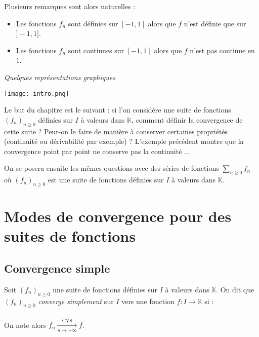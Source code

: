 \documentclass[a4paper,10pt]{report}
\newcommand{\Sum}[2]{\ensuremath{\textstyle{\sum\limits_{#1}^{#2}}}}
\begin{document}
\noindent Plusieurs remarques sont alors naturelles : 

\begin{itemize}
\item Les fonctions $f_n$ sont définies sur $[-1,1]$ alors que $f$ n'est définie que sur $]-1,1]$.
\item Les fonctions $f_n$ sont continues sur $[-1,1]$ alors que $f$ n'est pas continue en $1$.
\end{itemize}

\medskip

\begin{center}
\textit{Quelques représentations graphiques}
\end{center}

\begin{center}
\texttt{[image: intro.png]}
\end{center}

\medskip

\noindent Le but du chapitre est le suivant : si l'on considère une suite de fonctions $(f_n)_{n \geq 0}$ définies sur $I$ à valeurs dans $\mathbb{K}$, comment définir la convergence de cette suite ? Peut-on le faire de manière à conserver certaines propriétés (continuité ou dérivabilité par exemple) ? L'exemple précédent montre que la convergence \og point par point \fg ne conserve pas la continuité ...

\medskip

\noindent On se posera ensuite les mêmes questions avec des séries de fonctions $\Sum{n \geq 0}{} f_n$ où $(f_n)_{n \geq 0}$ est une suite de fonctions définies sur $I$ à valeurs dans $\mathbb{K}$.


\section{Modes de convergence pour des suites de fonctions}

\subsection{Convergence simple}

\begin{defin} Soit $(f_n)_{n \geq 0}$ une suite de fonctions définies sur $I$ à valeurs dans $\mathbb{K}$. On dit que $(f_n)_{n \geq 0}$ \textit{converge simplement} sur $I$ vers une fonction $f : I \rightarrow \mathbb{K}$ si :
$$ \phantom{\forall x \in I, \quad \lim_{n \rightarrow + \infty} f_n(x) = f(x)} $$
On note alors $f_n \xrightarrow[n \rightarrow + \infty]{\textrm{CVS}} f$.
\end{defin}
\end{document}
